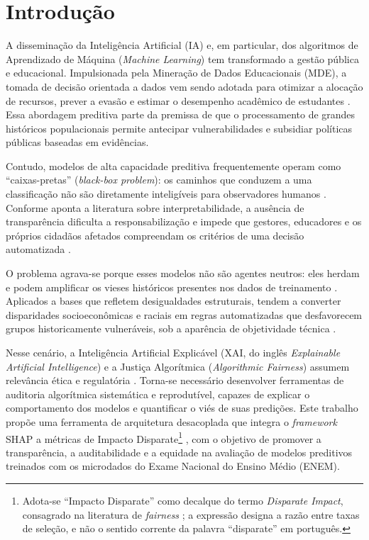 \chapter{Introdução}
\label{cap:introducao}
A disseminação da Inteligência Artificial (IA) e, em particular, dos algoritmos de Aprendizado de Máquina (\textit{Machine Learning}) tem transformado a gestão pública e educacional. Impulsionada pela Mineração de Dados Educacionais (MDE), a tomada de decisão orientada a dados vem sendo adotada para otimizar a alocação de recursos, prever a evasão e estimar o desempenho acadêmico de estudantes \cite{romero2010educational}. Essa abordagem preditiva parte da premissa de que o processamento de grandes históricos populacionais permite antecipar vulnerabilidades e subsidiar políticas públicas baseadas em evidências.

Contudo, modelos de alta capacidade preditiva frequentemente operam como ``caixas-pretas'' (\textit{black-box problem}): os caminhos que conduzem a uma classificação não são diretamente inteligíveis para observadores humanos \cite{adadi2018peeking}. Conforme aponta a literatura sobre interpretabilidade, a ausência de transparência dificulta a responsabilização e impede que gestores, educadores e os próprios cidadãos afetados compreendam os critérios de uma decisão automatizada \cite{adadi2018peeking, rudin2019stop}.

O problema agrava-se porque esses modelos não são agentes neutros: eles herdam e podem amplificar os vieses históricos presentes nos dados de treinamento \cite{barocas2023fairness, mehrabi2021survey}. Aplicados a bases que refletem desigualdades estruturais, tendem a converter disparidades socioeconômicas e raciais em regras automatizadas que desfavorecem grupos historicamente vulneráveis, sob a aparência de objetividade técnica \cite{baker2022algorithmic}.

Nesse cenário, a Inteligência Artificial Explicável (XAI, do inglês \textit{Explainable Artificial Intelligence}) e a Justiça Algorítmica (\textit{Algorithmic Fairness}) assumem relevância ética e regulatória \cite{arrieta2020explainable, barocas2023fairness}. Torna-se necessário desenvolver ferramentas de auditoria algorítmica sistemática e reprodutível, capazes de explicar o comportamento dos modelos e quantificar o viés de suas predições. Este trabalho propõe uma ferramenta de arquitetura desacoplada que integra o \textit{framework} SHAP \cite{lundberg2017unified} a métricas de Impacto Disparate\footnote{Adota-se ``Impacto Disparate'' como decalque do termo \textit{Disparate Impact}, consagrado na literatura de \textit{fairness} \cite{feldman2015certifying}; a expressão designa a razão entre taxas de seleção, e não o sentido corrente da palavra ``disparate'' em português.} \cite{feldman2015certifying}, com o objetivo de promover a transparência, a auditabilidade e a equidade na avaliação de modelos preditivos treinados com os microdados do Exame Nacional do Ensino Médio (ENEM).

